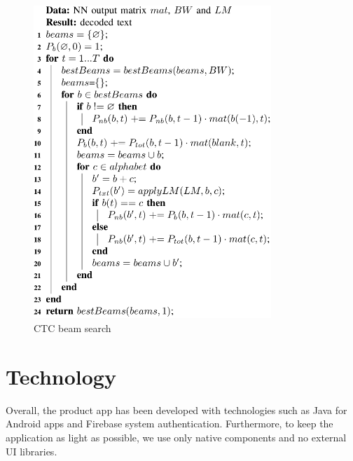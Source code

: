 \begin{figure}[H]
	\centering
	\includegraphics[width=0.8\textwidth]{img/Chap3/BS_CTC}
	\caption{ CTC beam search }
	\label{fig:Chap3-BS_CTC}
\end{figure}

\newpage
\section{Technology}
Overall, the product app has been developed with technologies such as Java for Android apps and Firebase system authentication. Furthermore, to keep the application as light as possible, we use only native components and no external UI libraries.



